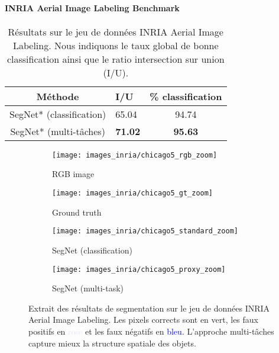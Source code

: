 \paragraph{INRIA Aerial Image Labeling Benchmark}

\begin{table}
\begin{tabularx}{0.49\textwidth}{c Y c}
\toprule
Méthode & I/U & \% classification\\
\midrule
SegNet* (classification) & 65.04 & 94.74\\
SegNet* (multi-tâches) & \textbf{71.02} & \textbf{95.63}\\
\bottomrule
\end{tabularx}
\caption{Résultats sur le jeu de données INRIA Aerial Image Labeling. Nous indiquons le taux global de bonne classification ainsi que le ratio intersection sur union (I/U).}
\label{tab:inria_results}
\end{table}

\begin{figure*}[t]
\begin{subfigure}{0.24\textwidth}
	\texttt{[image: images\_inria/chicago5\_rgb\_zoom]}
    \caption{RGB image}
\end{subfigure}
\begin{subfigure}{0.24\textwidth}
	\texttt{[image: images\_inria/chicago5\_gt\_zoom]}
    \caption{Ground truth}
\end{subfigure}
\begin{subfigure}{0.24\textwidth}
	\texttt{[image: images\_inria/chicago5\_standard\_zoom]}
    \caption{SegNet (classification)}
\end{subfigure}
\begin{subfigure}{0.24\textwidth}
	\texttt{[image: images\_inria/chicago5\_proxy\_zoom]}
    \caption{SegNet (multi-task)}
\end{subfigure}
\caption{Extrait des résultats de segmentation sur le jeu de données INRIA Aerial Image Labeling. Les pixels corrects sont en \textcolor{OliveGreen}{vert}, les faux positifs en \textcolor{Lavender}{rose} et les faux négatifs en \textcolor{Blue}{bleu}. L'approche multi-tâches capture mieux la structure spatiale des objets.}
\label{fig:inria_results}
\end{figure*}

